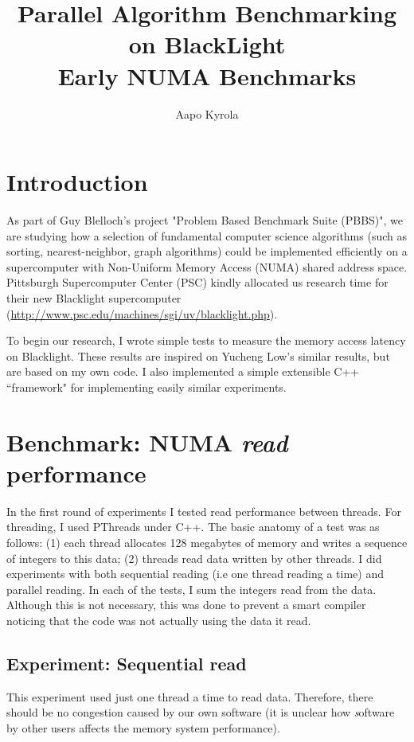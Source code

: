 \documentclass[12pt]{article}
\title{ {\bf   Parallel Algorithm Benchmarking on BlackLight }\\
Early NUMA Benchmarks
}
\author{Aapo Kyrola}
\begin{document}
 
 \maketitle

\section{Introduction}

As part of Guy Blelloch's project "Problem Based Benchmark Suite (PBBS)", we are studying how a selection of  fundamental computer science algorithms (such as sorting, nearest-neighbor, graph algorithms) could be implemented efficiently on a supercomputer with Non-Uniform Memory Access (NUMA) shared address space.  Pittsburgh Supercomputer Center (PSC) kindly allocated us research time for their new Blacklight supercomputer (\url{http://www.psc.edu/machines/sgi/uv/blacklight.php}).

To begin our research, I wrote simple tests to measure the memory access latency on Blacklight. These results are inspired on Yucheng Low's similar results, but are based on my own code. I also implemented a simple extensible C++ ``framework" for implementing easily similar experiments. 

\section{Benchmark: NUMA {\it read} performance}

In the first round of experiments I tested read performance between threads. For threading, I used PThreads under C++. 
The basic anatomy of a test was as follows:  (1) each thread allocates 128 megabytes of memory and writes a sequence of integers to this data; (2) threads read data written by other threads. I did experiments with both sequential reading (i.e one thread reading a time) and parallel reading.  In each of the tests, I sum the integers read from the data. Although this is not necessary, this was done to prevent a smart compiler noticing that the code was not actually using the data it read.

\subsection{Experiment:  Sequential read}

This experiment used just one thread a time to read data. Therefore, there should be no congestion caused by our own software (it is unclear how {\emph software by other users} affects the memory system performance). 
\end{document}
